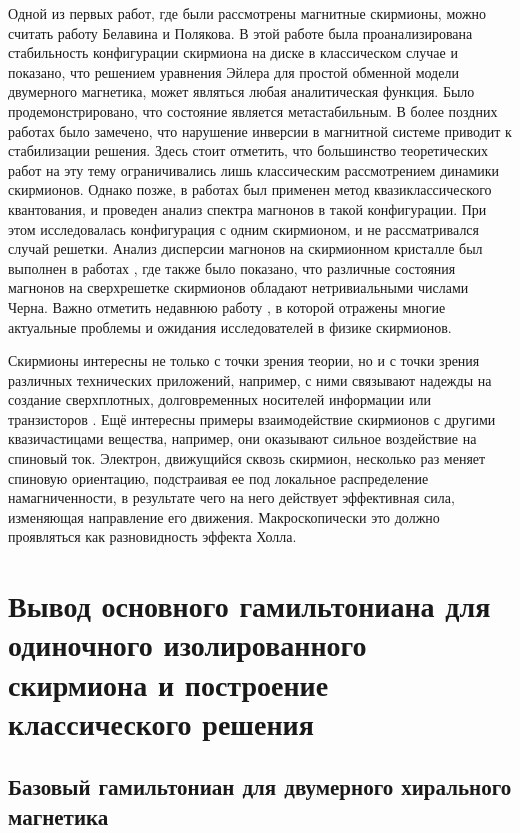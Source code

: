 \documentclass[a4paper,article,14pt]{extarticle}
\begin{document}
Одной из первых работ, где были рассмотрены магнитные скирмионы, можно считать работу Белавина и Полякова. \cite{belavin} В этой работе была проанализирована стабильность конфигурации скирмиона на диске в классическом случае и показано, что решением уравнения Эйлера для простой обменной модели двумерного магнетика, может являться любая аналитическая функция. Было продемонстрировано, что состояние является метастабильным. В более поздних работах было замечено, что нарушение инверсии в магнитной системе приводит к стабилизации решения.\cite{bogdanov} Здесь стоит отметить, что большинство теоретических работ на эту тему ограничивались лишь классическим рассмотрением динамики скирмионов.\cite{kiselevBogdanov} Однако позже, в работах  \cite{aristov1, garst} был применен метод квазиклассического квантования, и проведен анализ спектра магнонов в такой конфигурации. При этом исследовалась конфигурация с одним скирмионом, и не рассматривался случай решетки. Анализ дисперсии магнонов на скирмионном кристалле был выполнен в работах \cite{garst_2017, roldan}, где также было показано, что различные состояния магнонов на сверхрешетке скирмионов обладают нетривиальными числами Черна. Важно отметить недавнюю работу \cite{back}, в которой отражены многие актуальные проблемы и ожидания исследователей в физике скирмионов.

Скирмионы интересны не только с точки зрения теории, но и с точки зрения различных технических приложений, например, с ними связывают надежды на создание сверхплотных, долговременных носителей информации \cite{fert} или транзисторов \cite{zhang}. Ещё интересны примеры взаимодействие скирмионов с другими квазичастицами вещества, например, они оказывают сильное воздействие на спиновый ток. Электрон, движущийся сквозь скирмион, несколько раз меняет спиновую ориентацию, подстраивая ее под локальное распределение намагниченности, в результате чего на него действует эффективная сила, изменяющая направление его движения. Макроскопически это должно проявляться как разновидность эффекта Холла.\cite{rosch_pfleiderer}


\pagebreak
\section{Вывод основного гамильтониана для одиночного изолированного скирмиона и построение классического решения}
\subsection{Базовый гамильтониан для двумерного хирального магнетика}
\end{document}
